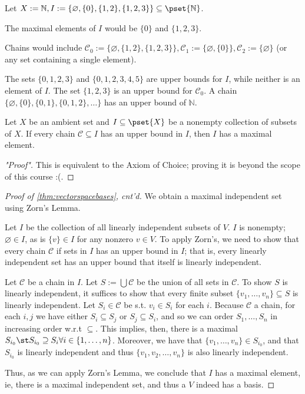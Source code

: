 \begin{example}
    Let $X := \mathbb{N}, I := \{\varnothing, \{0\}, \{1, 2\}, \{1, 2, 3\}\} \subseteq \pset{\mathbb{N}}$.

    The maximal elements of $I$ would be $\{0\}$ and $\{1, 2, 3\}$.

    Chains would include $\mathcal{C}_0 := \{\varnothing, \{1, 2 \}, \{1,2,3\}\}, \mathcal{C}_1 := \{\varnothing, \{0\}\}, \mathcal{C}_2 := \{\varnothing\}$ (or any set containing a single element).

    The sets $\{0, 1, 2, 3\}$ and $\{0, 1, 2, 3, 4, 5\}$ are upper bounds for $I$, while neither is an element of $I$. The set $\{1, 2, 3\}$ is an upper bound for $\mathcal{C}_0$. A chain $\{\varnothing, \{0\}, \{0,1\}, \{0,1,2\}, \dots\}$ has an upper bound of $\mathbb{N}$.
\end{example}

\begin{lemma}\label{lemma:zorns}
    Let $X$ be an ambient set and $I \subseteq \pset{X}$ be a nonempty collection of subsets of $X$. If every chain $\mathcal{C} \subseteq I$ has an upper bound in $I$, then $I$ has a maximal element.
\end{lemma}

\begin{proof}["Proof"]
    This is equivalent to the Axiom of Choice; proving it is beyond the scope of this course :(.
\end{proof}

\begin{proof}[Proof of \cref{thm:vectorspacebases}, cnt'd]
    We obtain a maximal independent set using Zorn's Lemma.

    Let $I$ be the collection of all linearly independent subsets of $V$. $I$ is nonempty; $\varnothing \in I$, as is $\{v\} \in I$ for any nonzero $v \in V$. To apply Zorn's, we need to show that every chain $\mathcal{C}$ if sets in $I$ has an upper bound in $I$; that is, every linearly independent set has an upper bound that itself is linearly independent.

    Let $\mathcal{C}$ be a chain in $I$. Let $S := \bigcup \mathcal{C}$ be the union of all sets in $\mathcal{C}$. To show $S$ is linearly independent, it suffices to show that every finite subset $\{v_1, \dots, v_n\} \subseteq S$ is linearly independent. Let $S_i \in \mathcal{C}$ be s.t. $v_i \in S_i$ for each $i$. Because $\mathcal{C}$ a chain, for each $i,j$ we have either $S_i \subseteq S_j$ or $S_j \subseteq S_i$, and so we can order $S_1, \dots, S_n$ in increasing order w.r.t $\subseteq$. This implies, then, there is a maximal $S_{i_0} \st S_{i_0} \supseteq S_i \forall i \in \{1, \dots, n\}$. Moreover, we have that $\{v_1, \dots, v_n\} \in S_{i_0}$, and that $S_{i_0}$ is linearly independent and thus $\{v_1, v_2, \dots, v_n\}$ is also linearly independent. 

    Thus, as we can apply Zorn's Lemma, we conclude that $I$ has a maximal element, ie, there is a maximal independent set, and thus a $V$ indeed has a basis.
\end{proof}